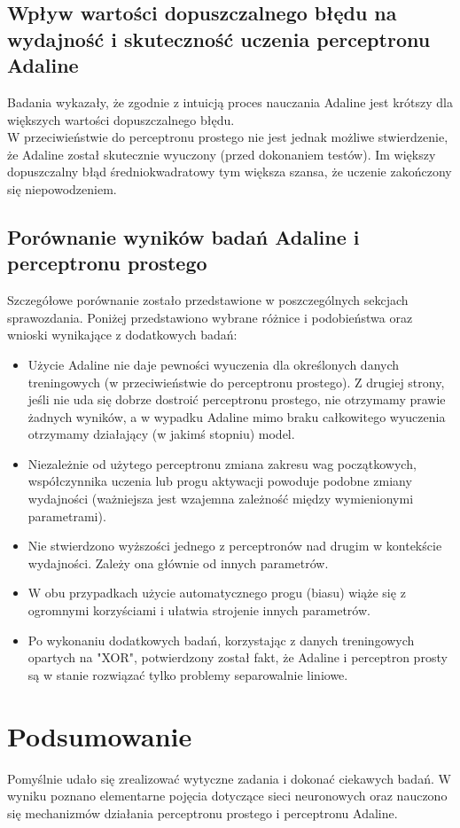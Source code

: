 \documentclass[17pt]{article}
\begin{document}
\subsection{Wpływ wartości dopuszczalnego błędu na wydajność i skuteczność uczenia perceptronu Adaline}
\vspace{4mm}

Badania wykazały, że zgodnie z intuicją proces nauczania Adaline jest krótszy dla większych wartości dopuszczalnego błędu.\\

W przeciwieństwie do perceptronu prostego nie jest jednak możliwe stwierdzenie, że Adaline został skutecznie wyuczony (przed dokonaniem testów). Im większy dopuszczalny błąd średniokwadratowy tym większa szansa, że uczenie zakończony się niepowodzeniem.

\subsection{Porównanie wyników badań Adaline i perceptronu prostego}
\vspace{4mm}

Szczegółowe porównanie zostało przedstawione w poszczególnych sekcjach sprawozdania. Poniżej przedstawiono wybrane różnice i podobieństwa oraz wnioski wynikające z dodatkowych badań:

\begin{itemize}
\item Użycie Adaline nie daje pewności wyuczenia dla określonych danych treningowych (w przeciwieństwie do perceptronu prostego). Z drugiej strony, jeśli nie uda się dobrze dostroić perceptronu prostego, nie otrzymamy prawie żadnych wyników, a w wypadku Adaline mimo braku całkowitego wyuczenia otrzymamy działający (w jakimś stopniu) model.
\item Niezależnie od użytego perceptronu zmiana zakresu wag początkowych, współczynnika uczenia lub progu aktywacji powoduje podobne zmiany wydajności (ważniejsza jest wzajemna zależność między wymienionymi parametrami).
\item Nie stwierdzono wyższości jednego z perceptronów nad drugim w kontekście wydajności. Zależy ona głównie od innych parametrów.
\item W obu przypadkach użycie automatycznego progu (biasu) wiąże się z ogromnymi korzyściami i ułatwia strojenie innych parametrów.
\item Po wykonaniu dodatkowych badań, korzystając z danych treningowych opartych na "XOR", potwierdzony został fakt, że Adaline i perceptron prosty są w stanie rozwiązać tylko problemy separowalnie liniowe.
\end{itemize}

\section{Podsumowanie}

Pomyślnie udało się zrealizować wytyczne zadania i dokonać ciekawych badań. W wyniku poznano elementarne pojęcia dotyczące sieci neuronowych oraz nauczono się mechanizmów działania perceptronu prostego i perceptronu Adaline.
\end{document}
